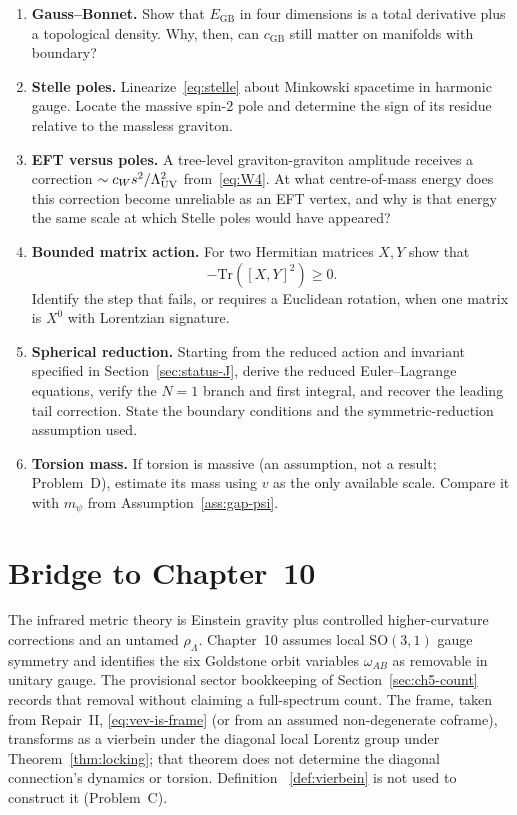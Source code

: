 \begin{enumerate}
  \item \textbf{Gauss--Bonnet.}
    Show that \(E_{\mathrm{GB}}\) in four dimensions is a total
    derivative plus a topological density. Why, then, can
    \(c_{\mathrm{GB}}\) still matter on manifolds with boundary?
  \item \textbf{Stelle poles.}
    Linearize~\eqref{eq:stelle} about Minkowski spacetime in
    harmonic gauge. Locate the massive spin-2 pole and determine
    the sign of its residue relative to the massless graviton.
  \item \textbf{EFT versus poles.}
    A tree-level graviton-graviton amplitude receives a correction
    \(\sim c_W s^2/\Lambda_{\mathrm{UV}}^2\) from~\eqref{eq:W4}. At what
    centre-of-mass energy does this correction become unreliable
    as an EFT vertex, and why is that energy the same scale at
    which Stelle poles would have appeared?
  \item \textbf{Bounded matrix action.}
    For two Hermitian matrices \(X,Y\) show that
    \[
    -\mathrm{Tr}([X,Y]^2) \ge 0.
    \]
    Identify the step that fails,
    or requires a Euclidean rotation, when one matrix is
    \(X^0\) with Lorentzian signature.
  \item \textbf{Spherical reduction.}
    Starting from the reduced action and invariant specified in
    Section~\ref{sec:status-J}, derive the reduced Euler--Lagrange
    equations, verify the \(N=1\) branch and first integral, and
    recover the leading tail correction. State the boundary
    conditions and the symmetric-reduction assumption used.
  \item \textbf{Torsion mass.}
    If torsion is massive (an assumption, not a result; Problem~D),
    estimate its mass using \(v\) as the only available scale.
    Compare it with \(m_\psi\) from Assumption~\ref{ass:gap-psi}.
\end{enumerate}

\section{Bridge to Chapter~10}
\label{sec:ch9-bridge}

The infrared metric theory is Einstein gravity plus controlled
higher-curvature corrections and an untamed \(\rho_\Lambda\).
Chapter~10 assumes local \(\mathrm{SO}(3,1)\) gauge symmetry and
identifies the six Goldstone orbit variables \(\omega_{AB}\) as
removable in unitary gauge. The provisional sector bookkeeping of
Section~\ref{sec:ch5-count} records that removal without claiming a
full-spectrum count. The frame, taken from Repair~II,
\eqref{eq:vev-is-frame} (or from an assumed non-degenerate coframe),
transforms as a vierbein under the diagonal local Lorentz group under
Theorem~\ref{thm:locking}; that theorem does not determine the
diagonal connection's dynamics or torsion. Definition~
\ref{def:vierbein} is not used to construct it (Problem~C).